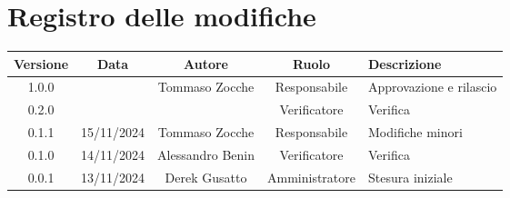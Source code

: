 
\section*{Registro delle modifiche}
\begin{table}[H]
    \begin{tabular}{|c|c|c|c|p{3cm}|}
        \hline
         \textbf{Versione} &  \textbf{Data} &  \textbf{Autore} &  \textbf{Ruolo} & \textbf{Descrizione} \\
        \hline
        1.0.0 &  & Tommaso Zocche & Responsabile & Approvazione e rilascio \\
        \hline
        0.2.0 &  &  & Verificatore & Verifica \\
        \hline
        0.1.1 & 15/11/2024 & Tommaso Zocche & Responsabile & Modifiche minori \\
        \hline
        0.1.0 & 14/11/2024 & Alessandro Benin & Verificatore & Verifica \\
        \hline
        0.0.1 & 13/11/2024 & Derek Gusatto & Amministratore  & Stesura iniziale \\
              \hline
    \end{tabular}
\end{table}